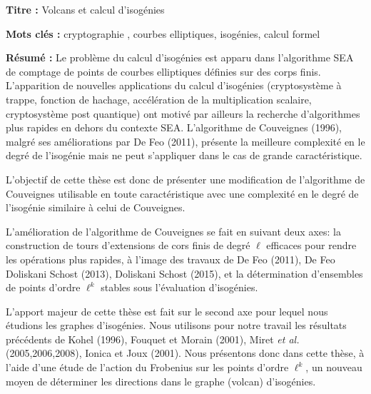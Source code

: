 \documentclass[a4paper, titlepage, 11pt]{book}
\newcommand{\titre}{Volcans et calcul d'isogénies}
\begin{document}
\begin{breakbox}

\noindent\textbf{Titre : }\titre

\vspace{2ex}

\noindent\textbf{Mots clés : }cryptographie , courbes elliptiques, isogénies, 
calcul formel

\begin{multicols}{2}
\noindent\textbf{Résumé : }
Le problème du calcul d'isogénies est apparu dans l'algorithme SEA de comptage
de points de courbes elliptiques définies sur des corps finis. L'apparition de 
nouvelles applications du calcul d'isogénies (cryptosystème à trappe, fonction 
de hachage, accélération de la multiplication scalaire, cryptosystème post 
quantique) ont motivé par ailleurs la recherche d'algorithmes plus rapides en 
dehors du contexte SEA. L'algorithme de Couveignes (1996), malgré ses 
améliorations par De Feo (2011), présente la meilleure complexité en le 
degré de l'isogénie mais ne peut s'appliquer dans le cas de grande 
caractéristique.

L'objectif de cette thèse est donc de présenter une modification de 
l'algorithme de Couveignes utilisable en toute caractéristique avec une 
complexité en le degré de l'isogénie similaire à celui de Couveignes.

L'amélioration de l'algorithme de Couveignes se fait en 
suivant deux axes: la construction de tours d'extensions de cors finis
de degré $\ell$ efficaces pour rendre les opérations plus rapides, à l'image 
des travaux de De Feo (2011), De Feo Doliskani Schost (2013), Doliskani 
Schost (2015), et la détermination d'ensembles de points d'ordre 
$\ell^k$ stables sous l'évaluation d'isogénies.

L'apport majeur de cette thèse est fait sur le second axe pour lequel nous 
étudions les graphes d'isogénies. Nous utilisons
pour notre travail les résultats précédents de Kohel (1996), Fouquet et Morain
(2001), Miret \emph{et al.} (2005,2006,2008), Ionica et Joux (2001). Nous 
présentons donc dans cette thèse, à l'aide d'une étude de l'action du Frobenius
sur les points d'ordre $\ell^k$, un nouveau moyen de déterminer les directions 
dans le graphe (volcan) d'isogénies.



\end{multicols}
\end{breakbox}
\end{document}
